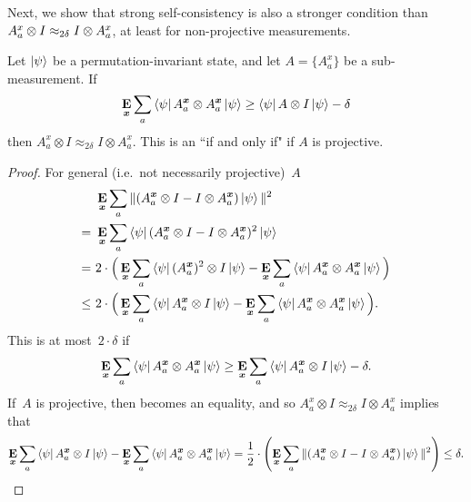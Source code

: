 Next, we show that strong self-consistency is also a stronger 
condition than $A^x_a \otimes I \approx_{2\delta} I \otimes A^x_a$, at least for non-projective measurements.

\begin{proposition}\label{prop:two-notions-of-self-consistency}
Let $\ket{\psi}$ be a permutation-invariant state,
and let $A = \{A^x_a\}$ be a sub-measurement. If
\begin{equation*}
\mathop{\bf E\/}_{{\boldsymbol{x}}} \sum_a \bra{\psi} A^{{\boldsymbol{x}}}_a \otimes A^{{\boldsymbol{x}}}_a \ket{\psi} \geq \bra{\psi} A \otimes I \ket{\psi} - \delta
\end{equation*}
then $A^x_a \otimes I \approx_{2\delta} I \otimes A^x_a$.
This is an ``if and only if" if $A$ is projective.
\end{proposition}
\begin{proof}
For general (i.e.\ not necessarily projective)~$A$
\begin{align}
&\mathop{\bf E\/}_{{\boldsymbol{x}}} \sum_a \Vert(A^{{\boldsymbol{x}}}_a \otimes I - I \otimes A^{{\boldsymbol{x}}}_a) \ket{\psi}\Vert^2\nonumber\\
=~&\mathop{\bf E\/}_{{\boldsymbol{x}}} \sum_a \bra{\psi} (A^{{\boldsymbol{x}}}_a \otimes I - I \otimes A^{{\boldsymbol{x}}}_a)^2 \ket{\psi}\nonumber\\
=~&2\cdot \Big( \mathop{\bf E\/}_{{\boldsymbol{x}}} \sum_a \bra{\psi} (A^{{\boldsymbol{x}}}_a)^2 \otimes I \ket{\psi} -  \mathop{\bf E\/}_{{\boldsymbol{x}}} \sum_a \bra{\psi} A^{{\boldsymbol{x}}}_a \otimes A^{{\boldsymbol{x}}}_a \ket{\psi}\Big)\nonumber\\
\leq~&2\cdot \Big( \mathop{\bf E\/}_{{\boldsymbol{x}}} \sum_a \bra{\psi} A^{{\boldsymbol{x}}}_a \otimes I \ket{\psi} -  \mathop{\bf E\/}_{{\boldsymbol{x}}} \sum_a \bra{\psi} A^{{\boldsymbol{x}}}_a \otimes A^{{\boldsymbol{x}}}_a \ket{\psi}\Big).\label{eq:here's-where-projectivity-would-help}
\end{align}
This is at most~$2\cdot \delta$ if
\begin{equation*}
\mathop{\bf E\/}_{{\boldsymbol{x}}} \sum_a \bra{\psi} A^{{\boldsymbol{x}}}_a \otimes A^{{\boldsymbol{x}}}_a \ket{\psi} \geq \mathop{\bf E\/}_{{\boldsymbol{x}}} \sum_a \bra{\psi} A^{{\boldsymbol{x}}}_a \otimes I \ket{\psi} - \delta.
\end{equation*}
If~$A$ is projective, then  becomes an equality,
and so $A^x_a \otimes I \approx_{2\delta} I \otimes A^x_a$ implies that
\begin{equation*}
 \mathop{\bf E\/}_{{\boldsymbol{x}}} \sum_a \bra{\psi} A^{{\boldsymbol{x}}}_a \otimes I \ket{\psi} -  \mathop{\bf E\/}_{{\boldsymbol{x}}} \sum_a \bra{\psi} A^{{\boldsymbol{x}}}_a \otimes A^{{\boldsymbol{x}}}_a \ket{\psi}
 = \frac{1}{2} \cdot \left(\mathop{\bf E\/}_{{\boldsymbol{x}}} \sum_a \Vert(A^{{\boldsymbol{x}}}_a \otimes I - I \otimes A^{{\boldsymbol{x}}}_a) \ket{\psi}\Vert^2\right) \leq \delta.\qedhere
\end{equation*}
\end{proof}

